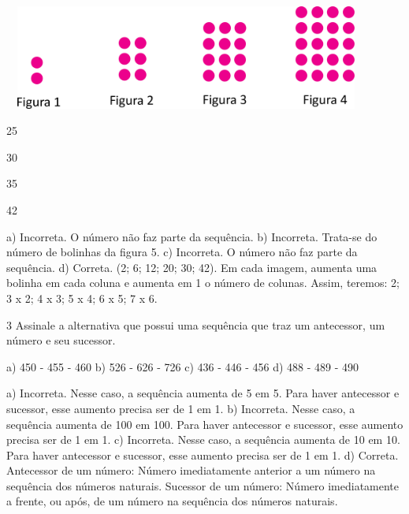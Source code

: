 \begin{escolha}

\includegraphics[width=4.75875in,height=1.35012in]{media/image37.png}

\begin{escolha}

\item
  25
\item
  30
\item
  35
\item
  42
\end{escolha}

a) Incorreta. O número não faz parte da sequência.
b) Incorreta. Trata-se do número de bolinhas da figura 5.
c) Incorreta. O número não faz parte da sequência.
d) Correta. (2; 6; 12; 20; 30; 42). Em cada imagem, aumenta uma bolinha em cada coluna e aumenta em 1 o número de colunas. Assim, teremos: 2; 3 x 2; 4 x 3; 5 x 4; 6 x 5; 7 x 6.

\num{3} Assinale a alternativa que possui uma sequência que traz um antecessor, um número e seu sucessor.

a) 450 - 455 - 460
b) 526 - 626 - 726
c) 436 - 446 - 456
d) 488 - 489 - 490

a) Incorreta. Nesse caso, a sequência aumenta de 5 em 5. Para haver antecessor e sucessor, esse aumento precisa ser de 1 em 1.
b) Incorreta. Nesse caso, a sequência aumenta de 100 em 100. Para haver antecessor e sucessor, esse aumento precisa ser de 1 em 1.
c) Incorreta. Nesse caso, a sequência aumenta de 10 em 10. Para haver antecessor e sucessor, esse aumento precisa ser de 1 em 1.
d) Correta. Antecessor de um número: Número imediatamente anterior a um número na sequência dos números naturais. Sucessor de um número: Número imediatamente a frente, ou após, de um número na sequência dos números naturais.

\chapter{}



\end{escolha}
